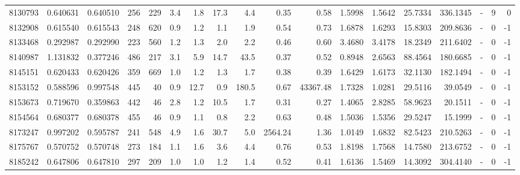 \begin{tabular}{rrrrrrrrrrrrrrrlrr}
   8130793 & 0.640631 &   0.640510 &  256 &  229 &      3.4 &      1.8 &    17.3 &      4.4 &       0.35 &        0.58 &  1.5998 &  1.5642 &   25.7334 &  336.1345 &             - &        9 &          0 \\
   8132908 & 0.615540 &   0.615543 &  248 &  620 &      0.9 &      1.2 &     1.1 &      1.9 &       0.54 &        0.73 &  1.6878 &  1.6293 &   15.8303 &  209.8636 &             - &        0 &         -1 \\
   8133468 & 0.292987 &   0.292990 &  223 &  560 &      1.2 &      1.3 &     2.0 &      2.2 &       0.46 &        0.60 &  3.4680 &  3.4178 &   18.2349 &  211.6402 &             - &        0 &         -1 \\
   8140987 & 1.131832 &   0.377246 &  486 &  217 &      3.1 &      5.9 &    14.7 &     43.5 &       0.37 &        0.52 &  0.8948 &  2.6563 &   88.4564 &  180.6685 &             - &        0 &         -1 \\
   8145151 & 0.620433 &   0.620426 &  359 &  669 &      1.0 &      1.2 &     1.3 &      1.7 &       0.38 &        0.39 &  1.6429 &  1.6173 &   32.1130 &  182.1494 &             - &        0 &         -1 \\
   8153152 & 0.588596 &   0.997548 &  445 &   40 &      0.9 &     12.7 &     0.9 &    180.5 &       0.67 &    43367.48 &  1.7328 &  1.0281 &   29.5116 &   39.0549 &             - &        0 &         -1 \\
   8153673 & 0.719670 &   0.359863 &  442 &   46 &      2.8 &      1.2 &    10.5 &      1.7 &       0.31 &        0.27 &  1.4065 &  2.8285 &   58.9623 &   20.1511 &             - &        0 &         -1 \\
   8154564 & 0.680377 &   0.680378 &  455 &   46 &      0.9 &      1.1 &     0.8 &      2.2 &       0.63 &        0.48 &  1.5036 &  1.5356 &   29.5247 &   15.1999 &             - &        0 &         -1 \\
   8173247 & 0.997202 &   0.595787 &  241 &  548 &      4.9 &      1.6 &    30.7 &      5.0 &    2564.24 &        1.36 &  1.0149 &  1.6832 &   82.5423 &  210.5263 &             - &        0 &         -1 \\
   8175767 & 0.570752 &   0.570748 &  273 &  184 &      1.1 &      1.6 &     3.6 &      4.4 &       0.76 &        0.53 &  1.8198 &  1.7568 &   14.7580 &  213.6752 &             - &        0 &         -1 \\
   8185242 & 0.647806 &   0.647810 &  297 &  209 &      1.0 &      1.0 &     1.2 &      1.4 &       0.52 &        0.41 &  1.6136 &  1.5469 &   14.3092 &  304.4140 &             - &        0 &         -1 \\

\end{tabular}
